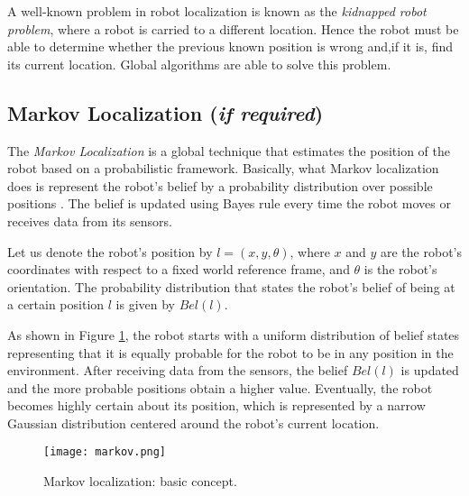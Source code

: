 A well-known problem in robot localization is known as the \textit{kidnapped robot problem}, where a robot is carried to a different location. Hence the robot must be able to determine whether the previous known position is wrong and,if it is, find its current location. Global algorithms are able to solve this problem. 

\subsection{Markov Localization (\textit{if required})}

The \textit{Markov Localization} is a global technique that estimates the position of the robot based on a probabilistic framework. Basically, what Markov localization does is represent the robot's belief by a probability distribution over possible positions \citep{Montecarlo}. The belief is updated using Bayes rule every time the robot moves or receives data from its sensors. 

Let us denote the robot's position by  $l=(x,y,\theta)$, where $x$ and $y$ are the robot's coordinates with respect to a fixed world reference frame, and $\theta$ is the robot's orientation. The probability distribution that states the robot's belief of being at a certain position $l$ is given by $Bel(l)$.

As shown in Figure \ref{fig:markov}, the robot starts with a uniform distribution of belief states representing that it is equally probable for the robot to be in any position in the environment. After receiving data from the sensors, the belief $Bel(l)$ is updated and the more probable positions obtain a higher value. Eventually, the robot becomes highly certain about its position, which is represented by a narrow Gaussian distribution centered around the robot's current location.

\begin{figure}[H]
	\centering
	\texttt{[image: markov.png]}
	\vspace{-10pt}
	\caption{Markov localization: basic concept. \citep[chap. 2, page 393]{Markov}}
	\vspace{-15pt}
	\label{fig:markov}
\end{figure}

